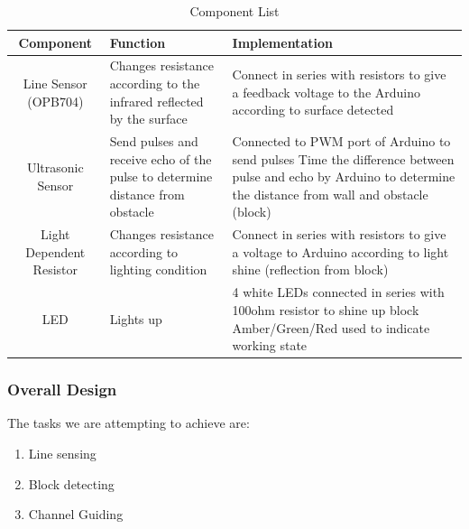 \documentclass{article}
\begin{document}
\begin{table}[!h]
    \centering
    \begin{tabular}{|c|p{5cm}|p{5cm}|}
\hline
Component &
  Function &
  Implementation
   \\
   \hline
Line Sensor (OPB704) &
  Changes resistance according to the infrared reflected by the surface &
  Connect in series with resistors to give a feedback voltage to the Arduino according to surface detected
   \\
   \hline
Ultrasonic Sensor &
  Send pulses and receive echo of the pulse to determine distance from obstacle &
Connected to PWM port of Arduino to send pulses  Time the difference between pulse and echo by Arduino to determine the distance from wall and obstacle (block)
   \\
   \hline
Light Dependent Resistor &
  Changes resistance according to lighting condition &
  Connect in series with resistors   to give a voltage to Arduino according to light shine (reflection from block) 
   \\
   \hline
LED &
  Lights up &
4 white LEDs connected in series with 100ohm resistor to shine up block Amber/Green/Red used to indicate   working state\\
  \hline
    \end{tabular}
    \caption{Component List}
    \label{tab:mount_sens}
\end{table}

\subsubsection{Overall Design}
\quad The tasks we are attempting to achieve are:
\begin{enumerate}
    \item Line sensing
    \item Block detecting
    \item Channel Guiding
\end{enumerate}
\end{document}
